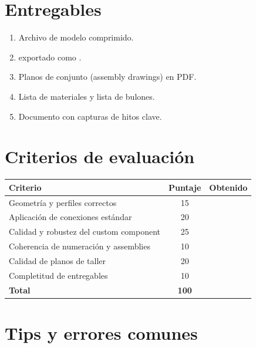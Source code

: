 \documentclass[11pt,a4paper]{article}
\begin{document}
\section{Entregables}
\begin{entregable}
\begin{enumerate}
    \item Archivo de modelo  comprimido.
    \item {} exportado como .
    \item Planos de conjunto (assembly drawings) en PDF.
    \item Lista de materiales y lista de bulones.
    \item Documento con capturas de hitos clave.
\end{enumerate}
\end{entregable}

\section{Criterios de evaluación}
\begin{table}[H]
\centering
\begin{tabularx}{\textwidth}{Xcc}
\toprule
\textbf{Criterio} & \textbf{Puntaje} & \textbf{Obtenido} \\
\midrule
Geometría y perfiles correctos & 15 & \\
Aplicación de conexiones estándar & 20 & \\
Calidad y robustez del custom component & 25 & \\
Coherencia de numeración y assemblies & 10 & \\
Calidad de planos de taller & 20 & \\
Completitud de entregables & 10 & \\
\midrule
\textbf{Total} & \textbf{100} & \\
\bottomrule
\end{tabularx}
\end{table}

\section{Tips y errores comunes}
\begin{tip}
[Tip 1]
\end{tip}
\end{document}
